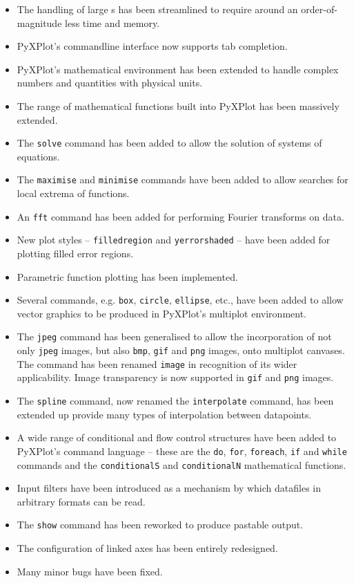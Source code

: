 \begin{itemize}
\item The handling of large \datafile s has been streamlined to require around an order-of-magnitude less time and memory.
\item PyXPlot's commandline interface now supports tab completion.
\item PyXPlot's mathematical environment has been extended to handle complex numbers and quantities with physical units.
\item The range of mathematical functions built into PyXPlot has been massively extended.
\item The {\tt solve} command has been added to allow the solution of systems of equations.
\item The {\tt maximise} and {\tt minimise} commands have been added to allow searches for local extrema of functions.
\item An {\tt fft} command has been added for performing Fourier transforms on data.
\item New plot styles -- {\tt filledregion} and {\tt yerrorshaded} -- have been added for plotting filled error regions.
\item Parametric function plotting has been implemented.
\item Several commands, e.g. {\tt box}, {\tt circle}, {\tt ellipse}, etc., have been added to allow vector graphics to be produced in PyXPlot's multiplot environment.
\item The {\tt jpeg} command has been generalised to allow the incorporation of not only {\tt jpeg} images, but also {\tt bmp}, {\tt gif} and {\tt png} images, onto multiplot canvases. The command has been renamed {\tt image} in recognition of its wider applicability. Image transparency is now supported in {\tt gif} and {\tt png} images.
\item The {\tt spline} command, now renamed the {\tt interpolate} command, has been extended up provide many types of interpolation between datapoints.
\item A wide range of conditional and flow control structures have been added to PyXPlot's command language -- these are the {\tt do}, {\tt for}, {\tt foreach}, {\tt if} and {\tt while} commands and the {\tt cond\-ition\-alS} and {\tt con\-dition\-alN} mathematical functions.
\item Input filters have been introduced as a mechanism by which datafiles in arbitrary formats can be read.
\item The {\tt show} command has been reworked to produce pastable output.
\item The configuration of linked axes has been entirely redesigned.
\item Many minor bugs have been fixed.
\end{itemize}

